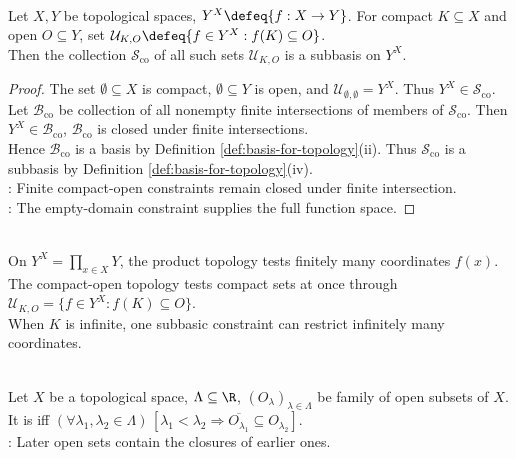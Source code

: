 \begin{proposition} \label{prop:compact-open-collection-is-subbasis} \\
Let $X,Y$ be topological spaces, $Y^X\defeq\{f:X\to Y\}$. For compact $K\subseteq X$ and open $O\subseteq Y$, set $\mathcal{U}_{K,O}\defeq\{f\in Y^X:f(K)\subseteq O\}$.\\
Then the collection $\mathcal{S}_{\mathrm{co}}$ of all such sets $\mathcal{U}_{K,O}$ is a subbasis on $Y^X$.
\begin{proof}
The set $\emptyset\subseteq X$ is compact, $\emptyset\subseteq Y$ is open, and $\mathcal{U}_{\emptyset,\emptyset}=Y^X$. Thus $Y^X\in\mathcal{S}_{\mathrm{co}}$.\\
Let $\mathcal{B}_{\mathrm{co}}$ be collection of all nonempty finite intersections of members of $\mathcal{S}_{\mathrm{co}}$. Then $Y^X\in\mathcal{B}_{\mathrm{co}}$, $\mathcal{B}_{\mathrm{co}}$ is closed under finite intersections.\\
Hence $\mathcal{B}_{\mathrm{co}}$ is a basis by Definition \ref{def:basis-for-topology}(ii). Thus $\mathcal{S}_{\mathrm{co}}$ is a subbasis by Definition \ref{def:basis-for-topology}(iv).\\
: Finite compact-open constraints remain closed under finite intersection.\\
: The empty-domain constraint supplies the full function space.
\end{proof}
\end{proposition}

\begin{remark} \label{rem:compact-open-versus-product-topology} \\
On $Y^X=\prod\limits_{x\in X}Y$, the product topology tests finitely many coordinates $f(x)$.\\
The compact-open topology tests compact sets at once through $\mathcal{U}_{K,O}=\{f\in Y^X:f(K)\subseteq O\}$.\\
When $K$ is infinite, one subbasic constraint can restrict infinitely many coordinates.
\end{remark}

\begin{definition} \label{def:normally-ascending-family} \\
Let $X$ be a topological space, $\Lambda\subseteq\R$, $(O_\lambda)_{\lambda\in\Lambda}$ be family of open subsets of $X$.\\
It is  iff $(\forall\lambda_1,\lambda_2\in\Lambda)\,[\lambda_1<\lambda_2\Rightarrow\overline{O_{\lambda_1}}\subseteq O_{\lambda_2}]$.\\
: Later open sets contain the closures of earlier ones.
\end{definition}


